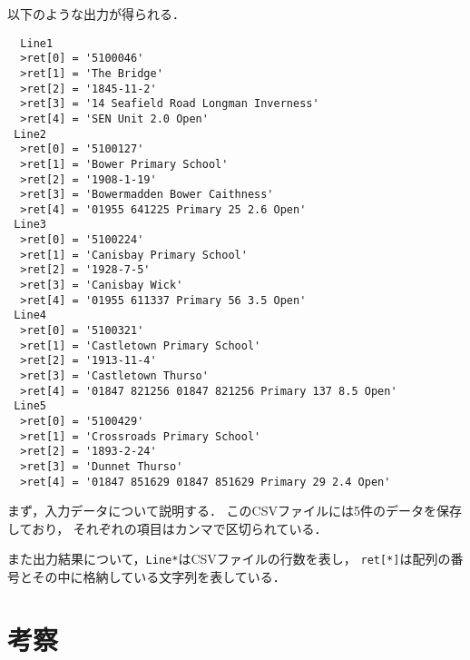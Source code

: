 \noindent %
以下のような出力が得られる．

{\fontsize{10pt}{11pt} \selectfont
 \begin{verbatim}
  Line1
  >ret[0] = '5100046'
  >ret[1] = 'The Bridge'
  >ret[2] = '1845-11-2'
  >ret[3] = '14 Seafield Road Longman Inverness'
  >ret[4] = 'SEN Unit 2.0 Open'
 Line2
  >ret[0] = '5100127'
  >ret[1] = 'Bower Primary School'
  >ret[2] = '1908-1-19'
  >ret[3] = 'Bowermadden Bower Caithness'
  >ret[4] = '01955 641225 Primary 25 2.6 Open'
 Line3
  >ret[0] = '5100224'
  >ret[1] = 'Canisbay Primary School'
  >ret[2] = '1928-7-5'
  >ret[3] = 'Canisbay Wick'
  >ret[4] = '01955 611337 Primary 56 3.5 Open'
 Line4
  >ret[0] = '5100321'
  >ret[1] = 'Castletown Primary School'
  >ret[2] = '1913-11-4'
  >ret[3] = 'Castletown Thurso'
  >ret[4] = '01847 821256 01847 821256 Primary 137 8.5 Open'
 Line5
  >ret[0] = '5100429'
  >ret[1] = 'Crossroads Primary School'
  >ret[2] = '1893-2-24'
  >ret[3] = 'Dunnet Thurso'
  >ret[4] = '01847 851629 01847 851629 Primary 29 2.4 Open'
 \end{verbatim}
}

まず，入力データについて説明する．
このCSVファイルには5件のデータを保存しており，
それぞれの項目はカンマで区切られている．




また出力結果について，\verb|Line*|はCSVファイルの行数を表し，
\verb|ret[*]|は配列の番号とその中に格納している文字列を表している．



\section{考察} \label{sec:5}

